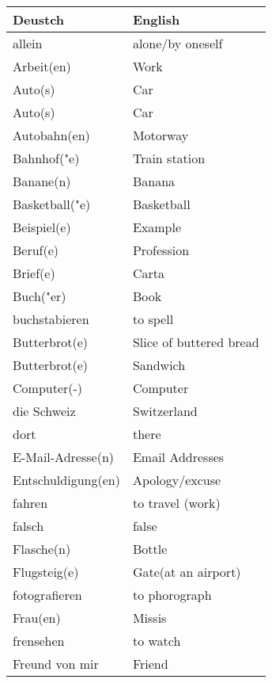 \documentclass{article}
\renewcommand{\arraystretch}{1}
\begin{document}
\begin{minipage}{0.48\textwidth}
    \centering
    \renewcommand{\arraystretch}{1.5}
    \begin{tabular}{|>{\raggedright\arraybackslash}p{3.5cm}|>{\raggedright\arraybackslash}p{3.5cm}|}
        \hline
        \rowcolor{gray!20} \textbf{Deustch} & \textbf{English} \\
        \hline
        allein & alone/by oneself \\\hline
        Arbeit(en) & Work \\\hline
        Auto(s) & Car \\\hline
        Auto(s) & Car \\\hline
        Autobahn(en) & Motorway \\\hline
        Bahnhof("e) & Train station \\\hline
        Banane(n) & Banana \\\hline
        Basketball("e) & Basketball \\\hline
        Beispiel(e) & Example \\\hline
        Beruf(e) & Profession \\\hline
        Brief(e) & Carta \\\hline
        Buch("er) & Book \\\hline
        buchstabieren & to spell \\\hline
        Butterbrot(e) & Slice of buttered bread \\\hline
        Butterbrot(e) & Sandwich \\\hline
        Computer(-) & Computer \\\hline
        die Schweiz & Switzerland \\\hline
        dort & there \\\hline
        E-Mail-Adresse(n) & Email Addresses \\\hline
        Entschuldigung(en) & Apology/excuse \\\hline
        fahren & to travel (work) \\\hline
        falsch & false \\\hline
        Flasche(n) & Bottle \\\hline
        Flugsteig(e) & Gate(at an airport) \\\hline
        fotografieren & to phorograph \\\hline
        Frau(en) & Missis \\\hline
        frensehen & to watch  \\\hline
        Freund von mir & Friend \\\hline

\end{tabular}
\end{minipage}
\end{document}
